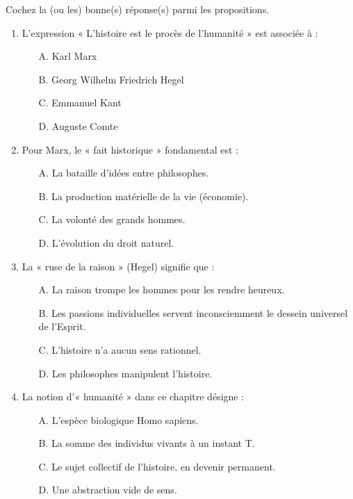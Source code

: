 \documentclass[11pt]{article}
\begin{document}
\begin{exercice}
Cochez la (ou les) bonne(s) réponse(s) parmi les propositions.
\begin{enumerate}
    \item L'expression « L'histoire est le procès de l'humanité » est associée à :
    \begin{itemize}
        \item[A.] Karl Marx
        \item[B.] Georg Wilhelm Friedrich Hegel
        \item[C.] Emmanuel Kant
        \item[D.] Auguste Comte
    \end{itemize}
    \item Pour Marx, le « fait historique » fondamental est :
    \begin{itemize}
        \item[A.] La bataille d'idées entre philosophes.
        \item[B.] La production matérielle de la vie (économie).
        \item[C.] La volonté des grands hommes.
        \item[D.] L'évolution du droit naturel.
    \end{itemize}
    \item La « ruse de la raison » (Hegel) signifie que :
    \begin{itemize}
        \item[A.] La raison trompe les hommes pour les rendre heureux.
        \item[B.] Les passions individuelles servent inconsciemment le dessein universel de l'Esprit.
        \item[C.] L'histoire n'a aucun sens rationnel.
        \item[D.] Les philosophes manipulent l'histoire.
    \end{itemize}
    \item La notion d'« humanité » dans ce chapitre désigne :
    \begin{itemize}
        \item[A.] L'espèce biologique Homo sapiens.
        \item[B.] La somme des individus vivants à un instant T.
        \item[C.] Le sujet collectif de l'histoire, en devenir permanent.
        \item[D.] Une abstraction vide de sens.
    \end{itemize}
\end{enumerate}
\end{exercice}
\end{document}
